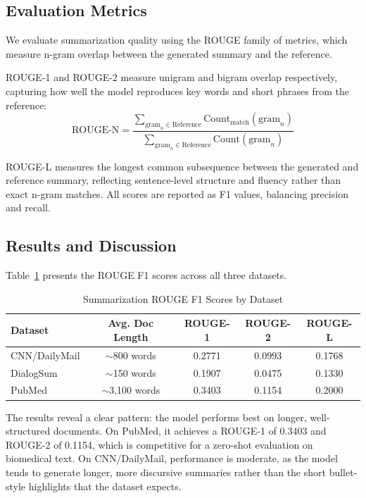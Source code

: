 \subsection{Evaluation Metrics}

We evaluate summarization quality using the ROUGE family of metrics, which measure n-gram overlap between the generated summary and the reference.

ROUGE-1 and ROUGE-2 measure unigram and bigram overlap respectively, capturing how well the model reproduces key words and short phrases from the reference:
\[
\text{ROUGE-N} = \frac{\sum_{\text{gram}_n \in \text{Reference}} \text{Count}_{\text{match}}(\text{gram}_n)}{\sum_{\text{gram}_n \in \text{Reference}} \text{Count}(\text{gram}_n)}
\]

ROUGE-L measures the longest common subsequence between the generated and reference summary, reflecting sentence-level structure and fluency rather than exact n-gram matches. All scores are reported as F1 values, balancing precision and recall.

\subsection{Results and Discussion}

Table~\ref{tab:sum_results} presents the ROUGE F1 scores across all three datasets.

\begin{table}[h!]
\centering
\caption{Summarization ROUGE F1 Scores by Dataset}
\label{tab:sum_results}
\begin{tabular}{|l|c|c|c|c|}
\hline
\textbf{Dataset} & \textbf{Avg. Doc Length} & \textbf{ROUGE-1} & \textbf{ROUGE-2} & \textbf{ROUGE-L} \\
\hline
CNN/DailyMail & $\sim$800 words  & 0.2771 & 0.0993 & 0.1768 \\
\hline
DialogSum     & $\sim$150 words  & 0.1907 & 0.0475 & 0.1330 \\
\hline
PubMed        & $\sim$3,100 words & 0.3403 & 0.1154 & 0.2000 \\
\hline
\end{tabular}
\end{table}

The results reveal a clear pattern: the model performs best on longer, well-structured documents. On PubMed, it achieves a ROUGE-1 of 0.3403 and ROUGE-2 of 0.1154, which is competitive for a zero-shot evaluation on biomedical text. On CNN/DailyMail, performance is moderate, as the model tends to generate longer, more discursive summaries rather than the short bullet-style highlights that the dataset expects.

